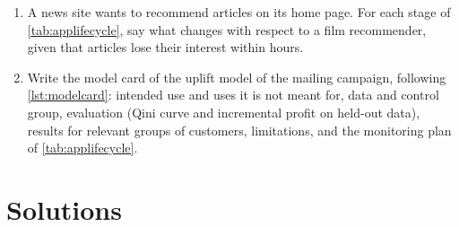 \begin{enumerate}[label=\textbf{7.\arabic*},ref=7.\arabic*,leftmargin=*,itemsep=6pt]
from 0.30 to 0.20. Is it worth making?
\item\label{exr7:lifecycle} A news site wants to recommend articles on its home page. For each stage of
\cref{tab:applifecycle}, say what changes with respect to a film recommender, given that articles lose
their interest within hours.
\item\label{exr7:modelcard} Write the model card of the uplift model of the mailing
campaign, following \cref{lst:modelcard}: intended use and uses it is not meant for, data and
control group, evaluation (Qini curve and incremental profit on held-out data), results for
relevant groups of customers, limitations, and the monitoring plan of \cref{tab:applifecycle}.
\end{enumerate}

\section*{Solutions}

